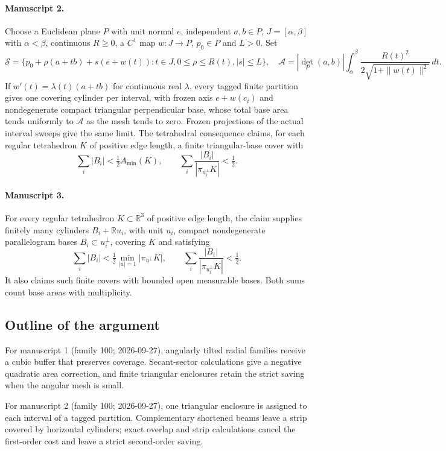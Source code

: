 \documentclass[11pt]{article}
\begin{document}
\paragraph{Manuscript 2.}
Choose a Euclidean plane $P$ with unit normal $e$, independent $a,b\in P$, $J=[\alpha,\beta]$ with $\alpha<\beta$, continuous $R\ge0$, a $C^1$ map $w:J\to P$, $p_0\in P$ and $L>0$. Set
\[
 \mathcal S=\{p_0+\rho(a+tb)+s(e+w(t)):t\in J,0\le\rho\le R(t),|s|\le L\},
 \quad\mathcal A=|\det_P(a,b)|\int_{\alpha}^{\beta}\frac{R(t)^2}{2\sqrt{1+\|w(t)\|^2}}\,dt.
\]
If $w'(t)=\lambda(t)(a+tb)$ for continuous real $\lambda$, every tagged finite partition gives one covering cylinder per interval, with frozen axis $e+w(c_i)$ and nondegenerate compact triangular perpendicular base, whose total base area tends uniformly to $\mathcal A$ as the mesh tends to zero. Frozen projections of the actual interval sweeps give the same limit. The tetrahedral consequence claims, for each regular tetrahedron $K$ of positive edge length, a finite triangular-base cover with
\[
 \sum_i|B_i|<\tfrac12 A_{\min}(K),\qquad
 \sum_i\frac{|B_i|}{|\pi_{u_i^{\perp}}K|}<\tfrac12.
\]

\paragraph{Manuscript 3.}
For every regular tetrahedron $K\subset\mathbb R^3$ of positive edge length, the claim supplies finitely many cylinders $B_i+\mathbb Ru_i$, with unit $u_i$, compact nondegenerate parallelogram bases $B_i\subset u_i^{\perp}$, covering $K$ and satisfying
\[
 \sum_i|B_i|<\tfrac12\min_{|u|=1}|\pi_{u^{\perp}}K|,
 \qquad\sum_i\frac{|B_i|}{|\pi_{u_i^{\perp}}K|}<\tfrac12.
\]
It also claims such finite covers with bounded open measurable bases. Both sums count base areas with multiplicity.

\subsection{Outline of the argument}
For manuscript 1 (family 100; 2026-09-27), angularly tilted radial families receive a cubic buffer that preserves coverage. Secant-sector calculations give a negative quadratic area correction, and finite triangular enclosures retain the strict saving when the angular mesh is small.

For manuscript 2 (family 100; 2026-09-27), one triangular enclosure is assigned to each interval of a tagged partition. Complementary shortened beams leave a strip covered by horizontal cylinders; exact overlap and strip calculations cancel the first-order cost and leave a strict second-order saving.
\end{document}
